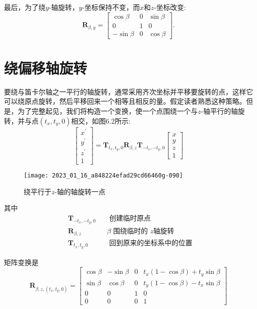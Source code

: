 最后，为了绕$y$-轴旋转，$y$-坐标保持不变，而$x$和$z$-坐标改变:
$$
\mathbf{R}_{\beta, y}=\left[\begin{array}{ccc}
\cos \beta & 0 & \sin \beta \\
0 & 1 & 0 \\
-\sin \beta & 0 & \cos \beta
\end{array}\right] .
$$

\section{绕偏移轴旋转}
要绕与笛卡尔轴之一平行的轴旋转，通常采用齐次坐标并平移要旋转的点，这样它可以绕原点旋转，然后平移回来一个相等且相反的量。假定读者熟悉这种策略。但是，为了完整起见，我们将构造一个变换，使一个点围绕一个与$z$-轴平行的轴旋转，并与点$\left(t_{x}, t_{y}, 0\right)$相交，如图6.2所示:
$$
\left[\begin{array}{c}
x^{\prime} \\
y^{\prime} \\
z^{\prime} \\
1
\end{array}\right]=\mathbf{T}_{t_{x}, t_{y}, 0} \mathbf{R}_{\beta, z} \mathbf{T}_{-t_{x},-t_{y}, 0}\left[\begin{array}{c}
x \\
y \\
z \\
1
\end{array}\right]
$$

\begin{figure}
    \centering
    \texttt{[image: 2023\_01\_16\_a848224efad29cd66460g-090]}
    \caption[short]{绕平行于$z$-轴的轴旋转一点}
\end{figure}

其中
$$
\begin{aligned}
& \mathbf{T}_{-t_{x},-t_{y}, 0} && \text { 创建临时原点 } \\
& \mathbf{R}_{\beta, z} && \beta \text { 围绕临时的 } z \text {轴旋转 } \\
& \mathbf{T}_{t_{x}, t_{y}, 0} && \text { 回到原来的坐标系中的位置 }
\end{aligned}
$$

矩阵变换是
$$
\mathbf{R}_{\beta, z,\left(t_{x}, t_{y}, 0\right)}=\left[\begin{array}{cccc}
\cos \beta & -\sin \beta & 0 & t_{x}(1-\cos \beta)+t_{y} \sin \beta \\
\sin \beta & \cos \beta & 0 & t_{y}(1-\cos \beta)-t_{x} \sin \beta \\
0 & 0 & 1 & 0 \\
0 & 0 & 0 & 1
\end{array}\right]
$$

